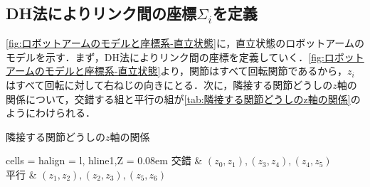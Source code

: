 \documentclass{ltjsarticle}
\begin{document}
\subsection{DH法によりリンク間の座標$\Sigma_i$を定義}
\cref{fig:ロボットアームのモデルと座標系-直立状態}に，直立状態のロボットアームのモデルを示す．まず，DH法によりリンク間の座標を定義していく．\cref{fig:ロボットアームのモデルと座標系-直立状態}より，関節はすべて回転関節であるから，$z_i$はすべて回転に対して右ねじの向きにとる．次に，隣接する関節どうしの$z$軸の関係について，交錯する組と平行の組が\cref{tab:隣接する関節どうしのz軸の関係}のようにわけられる．
\begin{table}[H]
	\centering
	\caption{隣接する関節どうしの$z$軸の関係}
	\label{tab:隣接する関節どうしのz軸の関係}
	\begin{tblr}{
		cells = {halign = l},
		hline{1,Z} = {0.08em}
	}
		交錯 & $(z_0, z_1), (z_3, z_4), (z_4, z_5)$ \\
		平行 & $(z_1, z_2), (z_2, z_3), (z_5, z_6)$
	\end{tblr}
\end{table}
\end{document}
